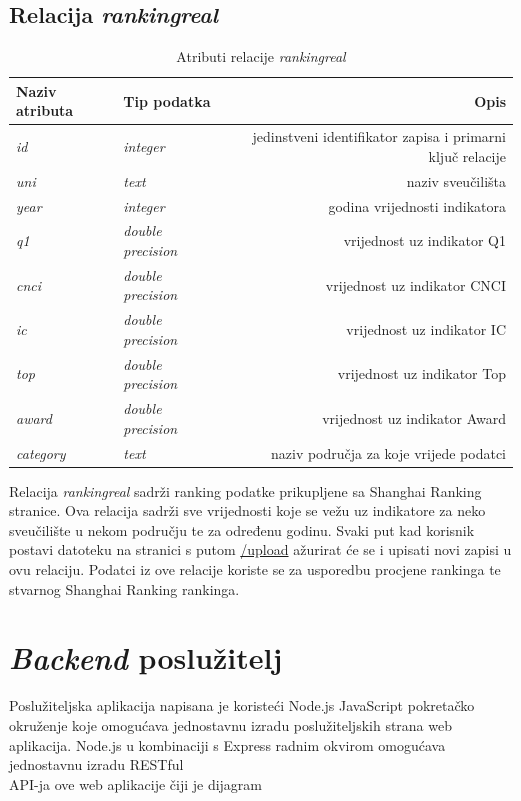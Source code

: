 \documentclass[times, utf8, zavrsni]{fer}
\begin{document}
\subsection{Relacija \emph{rankingreal}}
\begin{table}[htb]
    \caption{Atributi relacije \emph{rankingreal}}
        \label{tbl:rankingreal}
        \centering
        \begin{tabular}{llr} \hline
        Naziv atributa & Tip podatka & Opis\\ \hline
        \emph{id} &  \emph{integer} & jedinstveni identifikator zapisa i primarni ključ relacije\\
        \emph{uni} &  \emph{text} & naziv sveučilišta\\
        \emph{year} &  \emph{integer} & godina vrijednosti indikatora\\
        \emph{q1} &  \emph{double precision} & vrijednost uz indikator Q1\\
        \emph{cnci} &  \emph{double precision} & vrijednost uz indikator CNCI\\
        \emph{ic} &  \emph{double precision} & vrijednost uz indikator IC\\
        \emph{top} &  \emph{double precision} & vrijednost uz indikator Top\\
        \emph{award} &  \emph{double precision} & vrijednost uz indikator Award\\
        \emph{category} &  \emph{text} & naziv područja za koje vrijede podatci\\
        \end{tabular}
        \end{table}    
        \FloatBarrier 
Relacija \emph{rankingreal} sadrži ranking podatke prikupljene sa Shanghai Ranking stranice. Ova relacija sadrži sve 
vrijednosti koje se vežu uz indikatore za neko sveučilište u nekom području te za određenu godinu. Svaki put kad korisnik 
postavi datoteku na stranici s putom \url{/upload} ažurirat će se i upisati novi zapisi u ovu relaciju. Podatci iz ove 
relacije koriste se za usporedbu procjene rankinga te stvarnog Shanghai Ranking rankinga.
\newpage\section{\emph{Backend} poslužitelj}
Poslužiteljska aplikacija napisana je koristeći Node.js JavaScript pokretačko okruženje koje omogućava jednostavnu izradu poslužiteljskih strana 
web aplikacija. Node.js u kombinaciji s Express radnim okvirom omogućava jednostavnu izradu RESTful \\API-ja ove web aplikacije čiji je dijagram 
\end{document}
